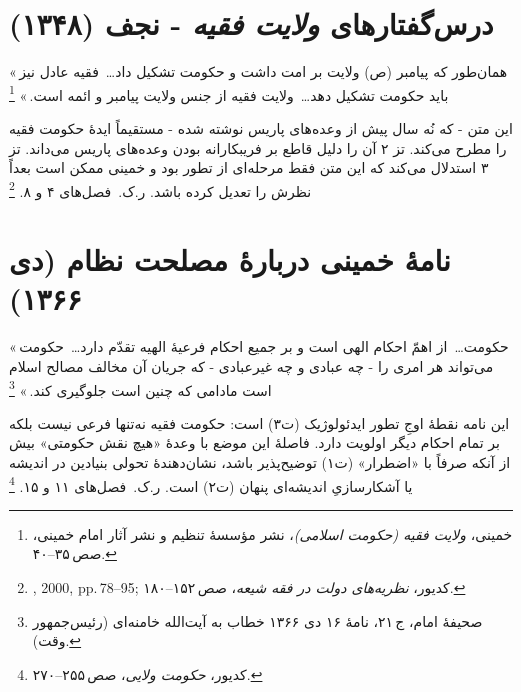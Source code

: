 \documentclass[12pt,a4paper]{book}
\newcommand{\en}[1]{\lr{\textit{#1}}}
\begin{document}
\section{درس‌گفتارهای \textit{ولایت فقیه} - نجف (۱۳۴۸)}
\label{sec:app-b-velayat}

\begin{warningBox}
«\,همان‌طور که پیامبر (ص) ولایت بر امت داشت
و حکومت تشکیل داد\dots\
فقیه عادل نیز باید حکومت تشکیل دهد\dots\
ولایت فقیه از جنس ولایت پیامبر و ائمه است.\,»%
\footnote{خمینی، \textit{ولایت فقیه (حکومت اسلامی)}،
نشر مؤسسهٔ تنظیم و نشر آثار امام خمینی، صص\,۳۵–۴۰.}
\end{warningBox}

\begin{noteBox}
این متن - که نُه سال پیش از وعده‌های پاریس نوشته شده -
مستقیماً ایدهٔ حکومت فقیه را مطرح می‌کند.
تز ۲ آن را دلیل قاطع بر فریبکارانه بودن وعده‌های پاریس می‌داند.
تز ۳ استدلال می‌کند که این متن فقط مرحله‌ای از تطور بود
و خمینی ممکن است بعداً نظرش را تعدیل کرده باشد.
ر.ک.\ فصل‌های ۴ و ۸.%
\footnote{\en{Martin}, 2000, pp.\,78–95;
کدیور، \textit{نظریه‌های دولت در فقه شیعه}، صص\,۱۵۲–۱۸۰.}
\end{noteBox}

\section{نامهٔ خمینی دربارهٔ مصلحت نظام (دی ۱۳۶۶)}
\label{sec:app-b-maslahat}

\begin{warningBox}
«\,حکومت\dots\ از اهمّ احکام الهی است
و بر جمیع احکام فرعیهٔ الهیه تقدّم دارد\dots\
حکومت می‌تواند هر امری را - چه عبادی و چه غیرعبادی -
که جریان آن مخالف مصالح اسلام است
مادامی که چنین است جلوگیری کند.\,»%
\footnote{صحیفهٔ امام، ج\,۲۱، نامهٔ ۱۶ دی ۱۳۶۶
خطاب به آیت‌الله خامنه‌ای (رئیس‌جمهور وقت).}
\end{warningBox}

\begin{noteBox}
این نامه نقطهٔ اوجِ تطور ایدئولوژیک (ت‌۳) است:
حکومت فقیه نه‌تنها فرعی نیست
بلکه بر تمام احکام دیگر اولویت دارد.
فاصلهٔ این موضع با وعدهٔ «هیچ نقش حکومتی»
بیش از آنکه صرفاً با «اضطرار» (ت‌۱) توضیح‌پذیر باشد،
نشان‌دهندهٔ تحولی بنیادین در اندیشه یا
آشکارسازیِ اندیشه‌ای پنهان (ت‌۲) است.
ر.ک.\ فصل‌های ۱۱ و ۱۵.%
\footnote{کدیور، \textit{حکومت ولایی}، صص\,۲۵۵–۲۷۰.}
\end{noteBox}
\end{document}
